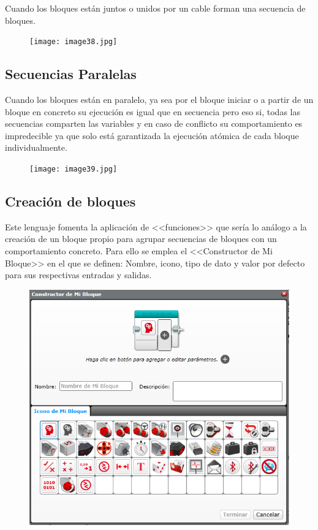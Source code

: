 \documentclass[12pt,a4paper]{article}
\begin{document}
Cuando los bloques están juntos o unidos por un cable forman una secuencia de
bloques.

\begin{figure}[H]
	\texttt{[image: image38.jpg]}
	\centering
\end{figure}

\subsection{Secuencias Paralelas}

Cuando los bloques están en paralelo, ya sea por el bloque iniciar o a partir de
un bloque en concreto su ejecución es igual que en secuencia pero eso si, todas
las secuencias comparten las variables y en caso de conflicto su  comportamiento
es impredecible ya que solo está garantizada la ejecución atómica de cada bloque
individualmente.

\begin{figure}[H]
	\texttt{[image: image39.jpg]}
	\centering
\end{figure}

\subsection{Creación de bloques}

Este lenguaje fomenta la aplicación de <<funciones>> que sería lo análogo a la
creación de un bloque propio para agrupar secuencias de bloques con un
comportamiento concreto. Para ello se emplea el <<Constructor de Mi Bloque>> en el
que se definen: Nombre, icono, tipo de dato y valor por defecto para sus
respectivas entradas y salidas.

\begin{figure}[H]
	\includegraphics{ConstructorBloques.PNG} 
	\centering
\end{figure}
\end{document}
